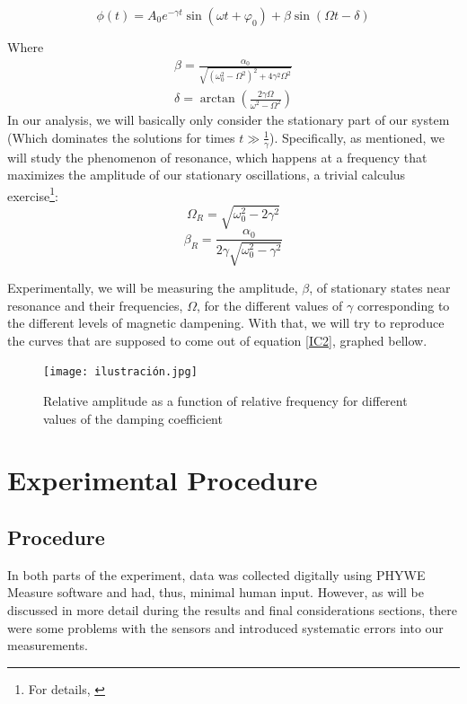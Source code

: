 \documentclass[a4paper,12pt]{article}
\begin{document}
\begin{equation}
    \phi(t) = A_0 e^{-\gamma t}\sin(\omega t + \varphi_0) + \beta \sin(\Omega t - \delta)
\end{equation}

Where
\begin{equation}
\label{IC2}
    \begin{gathered}
    \beta = \frac{\alpha_0}{\sqrt{(\omega_0^2-\Omega^2)^2+4\gamma^2\Omega^2}}\\
    \delta = \arctan(\frac{2\gamma\Omega}{\omega^2-\Omega^2})
    \end{gathered}
\end{equation}
In our analysis, we will basically only consider the stationary part of our system (Which dominates the solutions for times $t \gg \frac{1}{\gamma}$). Specifically, as mentioned, we will study the phenomenon of resonance, which happens at a frequency that maximizes the amplitude of our stationary oscillations, a trivial calculus exercise\footnote{For details, \cite[188]{Taylor}}:
\begin{equation}
\label{OmegaR}
    \Omega_R = \sqrt{\omega_0^2-2\gamma^2}
\end{equation}
\begin{equation}
\label{betaR}
    \beta_R = \frac{\alpha_0}{2\gamma \sqrt{\omega_0^2-\gamma^2}}
\end{equation}

Experimentally, we will be measuring the amplitude, $\beta$,  of stationary states near resonance and their frequencies, $\Omega$, for the different values of $\gamma$ corresponding to the different levels of magnetic dampening. With that, we will try to reproduce the curves that are supposed to come out of equation \ref{IC2}, graphed bellow.

\begin{figure}[H]
    \centering
    \caption{Relative amplitude as a function of relative frequency for different values of the damping coefficient}
    \texttt{[image: ilustración.jpg]}
    \label{fig:theory}
\end{figure}

\section{Experimental Procedure}

\subsection{Procedure}
In both parts of the experiment, data was collected digitally using PHYWE Measure software and had, thus, minimal human input. However, as will be discussed in more detail during the results and final considerations sections, there were some problems with the sensors and introduced systematic errors into our measurements.
\end{document}
